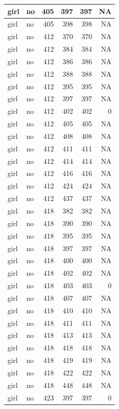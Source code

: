 \documentclass[man]{apa6}
\begin{document}
\begin{tabular}{l|l|r|r|r|r}
\hline
girl & no & 405 & 397 & 397 & NA\\
\hline
girl & no & 405 & 398 & 398 & NA\\
\hline
girl & no & 412 & 370 & 370 & NA\\
\hline
girl & no & 412 & 384 & 384 & NA\\
\hline
girl & no & 412 & 386 & 386 & NA\\
\hline
girl & no & 412 & 388 & 388 & NA\\
\hline
girl & no & 412 & 395 & 395 & NA\\
\hline
girl & no & 412 & 397 & 397 & NA\\
\hline
girl & no & 412 & 402 & 402 & 0\\
\hline
girl & no & 412 & 405 & 405 & NA\\
\hline
girl & no & 412 & 408 & 408 & NA\\
\hline
girl & no & 412 & 411 & 411 & NA\\
\hline
girl & no & 412 & 414 & 414 & NA\\
\hline
girl & no & 412 & 416 & 416 & NA\\
\hline
girl & no & 412 & 424 & 424 & NA\\
\hline
girl & no & 412 & 437 & 437 & NA\\
\hline
girl & no & 418 & 382 & 382 & NA\\
\hline
girl & no & 418 & 390 & 390 & NA\\
\hline
girl & no & 418 & 395 & 395 & NA\\
\hline
girl & no & 418 & 397 & 397 & NA\\
\hline
girl & no & 418 & 400 & 400 & NA\\
\hline
girl & no & 418 & 402 & 402 & NA\\
\hline
girl & no & 418 & 403 & 403 & 0\\
\hline
girl & no & 418 & 407 & 407 & NA\\
\hline
girl & no & 418 & 410 & 410 & NA\\
\hline
girl & no & 418 & 411 & 411 & NA\\
\hline
girl & no & 418 & 413 & 413 & NA\\
\hline
girl & no & 418 & 418 & 418 & NA\\
\hline
girl & no & 418 & 419 & 419 & NA\\
\hline
girl & no & 418 & 422 & 422 & NA\\
\hline
girl & no & 418 & 448 & 448 & NA\\
\hline
girl & no & 423 & 397 & 397 & 0\\

\end{tabular}
\end{document}
